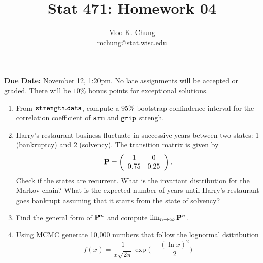 \documentclass[12pt]{article} %
\begin{document}
\title{Stat 471: Homework 04}
\author{Moo K. Chung\\
mchung@stat.wisc.edu}
\maketitle \thispagestyle{empty}

{\bf Due Date:} November 12, 1:20pm. No late assignments will be
accepted or graded. There will be $10\%$ bonus points for
exceptional solutions.

\begin{enumerate}
\item From $\tt{strength.data}$, compute a $95\%$ bootstrap confindence interval for the correlation coefficient of $\tt{arm}$ and $\tt{grip}$ strengh.

\item Harry's restaurant business fluctuate in successive years between two states: 1 (bankruptcy) and 2 (solvency). The transition matrix is given by
$${\bf P} = \left(\begin{array}{cc}
1 & 0 \\
0.75 &  0.25\\
\end{array}\right).$$
Check if the states are recurrent. What is the invariant distribution for the Markov chain? What is the expected number of years until Harry's restaurant goes bankrupt assuming that it starts from the state of solvency? 

\item Find the general form of ${\bf P}^n$ and compute $\lim_{n \to \infty} {\bf P}^n$. 


\item Using MCMC generate 10,000 numbers that follow the lognormal dsitribution
$$f(x)=\frac{1}{x\sqrt{2\pi}}\exp \Big(-\frac{(\ln x)^2}{2}\Big)$$\end{enumerate}
\end{document}
